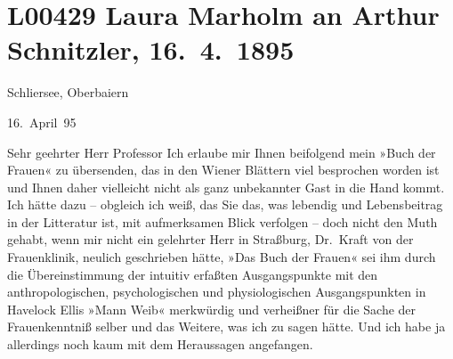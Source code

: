 

\section[Laura Marholm an Arthur Schnitzler, 16. 4. 1895]{L00429 Laura Marholm an Arthur Schnitzler, 16. 4. 1895}
\nopagebreak{}
\rehead{ }\normalsize\beginnumbering{}
\toendnotes[C]{\smallbreak\pagebreak[2]}
\toendnotes[C]{\smallbreak}
\pstart
           \raggedleft{}{\pb}Schliersee, Oberbaiern\pend
           
\pstart
           \raggedleft{}16. April 95\pend
           
\pstart\center{}Sehr geehrter Herr Professor\pend\vspace{0.5em}
\pstart
           Ich erlaube mir Ihnen beifolgend mein »Buch der
                  Frauen« zu übersenden, das in den Wiener
               Blättern viel besprochen worden ist und Ihnen daher vielleicht nicht als ganz
               unbekannter Gast in die Hand kommt. Ich hätte \introOben{}dazu\introOben{} –
               obgleich ich weiß, das Sie das, was lebendig und Lebensbeitrag in der Litteratur ist,
               mit aufmerksamen Blick verfolgen – doch nicht den Muth  gehabt, wenn mir nicht ein gelehrter Herr in Straßburg, Dr. Kraft von
               der Frauenklinik, neulich geschrieben hätte,
                  »Das Buch der Frauen« sei ihm durch die
               Übereinstimmung der intuitiv erfaßten Ausgangspunkte mit den anthropologischen,
               psychologischen und physiologischen Ausgangspunkten in Havelock Ellis »Mann {\kaufmannsund} Weib« merkwürdig und verheißner für die Sache
                  {\pb}der Frauenkenntniß selber und das
               Weitere, was ich zu sagen hätte. Und ich habe ja allerdings noch kaum mit dem
               Heraussagen angefangen.\pend
           
